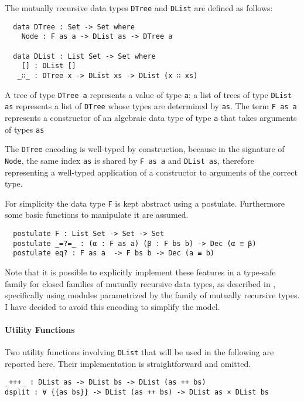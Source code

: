 \documentclass[../Thesis.tex]{subfiles}
\begin{document}
		The mutually recursive data types \texttt{DTree} and \texttt{DList} are
		defined as follows: 
					
\begin{verbatim}
  data DTree : Set -> Set where
    Node : F as a -> DList as -> DTree a

  data DList : List Set -> Set where
    [] : DList []
   _∷_ : DTree x -> DList xs -> DList (x ∷ xs)
\end{verbatim}
	
		A tree of type \texttt{DTree a} represents a value of type \texttt{a}; 
		a list of trees of type \texttt{DList as} represents a list of 
		\texttt{DTree} whose types are determined by \texttt{as}.
		The term \texttt{F as a} represents a constructor of an algebraic data
		type of type \texttt{a} that takes arguments of types \texttt{as} 

		The \texttt{DTree} encoding is well-typed by construction, because 
		in the signature of \texttt{Node}, the same index \texttt{as}
		is shared by \texttt{F as a} and \texttt{DList as}, therefore  
		representing a well-typed application of a constructor to arguments of 
		the correct type.
						
		For simplicity the data type \texttt{F} is kept abstract using a postulate. 
		Furthermore some basic functions to manipulate it are assumed.
		
\begin{verbatim}
  postulate F : List Set -> Set -> Set 
  postulate _=?=_ : (α : F as a) (β : F bs b) -> Dec (α ≅ β)
  postulate eq? : F as a  -> F bs b -> Dec (a ≡ b)
\end{verbatim}

	Note that it is possible to explicitly implement these features in a 
	type-safe family for closed families of mutually recursive data types, 
	as described in \cite{Lemp09}, specifically using modules parametrized
	by the family of mutually recursive types. 
	I have decided to avoid this encoding to simplify the model.
	
	\paragraph{Utility Functions}
	\label{par:UtilityFun}
	Two utility functions involving \texttt{DList} that will be used in the 
	following are reported here.
	Their implementation is straightforward and omitted.

\begin{verbatim}
_+++_ : DList as -> DList bs -> DList (as ++ bs)
dsplit : ∀ {{as bs}} -> DList (as ++ bs) -> DList as × DList bs
\end{verbatim}
	
\end{document}

